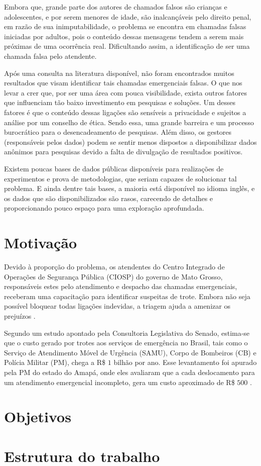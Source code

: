 Embora que, grande parte dos autores de chamados falsos são crianças e adolescentes, e por serem menores de idade, são inalcançáveis pelo direito penal, em razão de sua inimputabilidade, o problema se encontra em chamadas falsas iniciadas por adultos, pois o conteúdo dessas mensagens tendem a serem mais próximas de uma ocorrência real. Dificultando assim, a identificação de ser uma chamada falsa pelo atendente.

Após uma consulta na literatura disponível, não foram encontrados muitos resultados que visam identificar tais chamadas emergenciais falsas. O que nos levar a crer que, por ser uma área com pouca visibilidade, exista outros fatores que influenciam tão baixo investimento em pesquisas e soluções. Um desses fatores é que o conteúdo dessas ligações são sensíveis a privacidade e sujeitos a análise por um conselho de ética. Sendo essa, uma grande barreira e um processo burocrático para o desencadeamento de pesquisas. Além disso, os gestores (responsáveis pelos dados) podem se sentir menos dispostos a disponibilizar dados anônimos para pesquisas devido a falta de divulgação de resultados positivos.

Existem poucas bases de dados públicas disponíveis para realizações de experimentos e prova de metodologias, que seriam capazes de solucionar tal problema. E ainda dentre tais bases, a maioria está disponível no idioma inglês, e os dados que são disponibilizados são rasos, carecendo de detalhes e proporcionando pouco espaço para uma exploração aprofundada.

\section{Motivação}
Devido à proporção do problema, os atendentes do Centro Integrado de Operações de Segurança Pública (CIOSP) do governo de Mato Grosso, responsáveis estes pelo atendimento e despacho das chamadas emergenciais, receberam uma capacitação para identificar suspeitas de trote. Embora não seja possível bloquear todas ligações indevidas, a triagem ajuda a amenizar os prejuízos \citep{govMatoGrosso2016}.

Segundo um estudo apontado pela Consultoria Legislativa do Senado, estima-se que o custo gerado por trotes aos serviços de emergência no Brasil, tais como o Serviço de Atendimento Móvel de Urgência (SAMU), Corpo de Bombeiros (CB) e Polícia Militar (PM), chega a R\$ $1$ bilhão por ano. Esse levantamento foi apurado pela PM do estado do Amapá, onde eles avaliaram que a cada deslocamento para um atendimento emergencial incompleto, gera um custo aproximado de R\$ $500$ \citep{globo2014trotes, peixoto2015combate}.

\section{Objetivos}

\section{Estrutura do trabalho}

